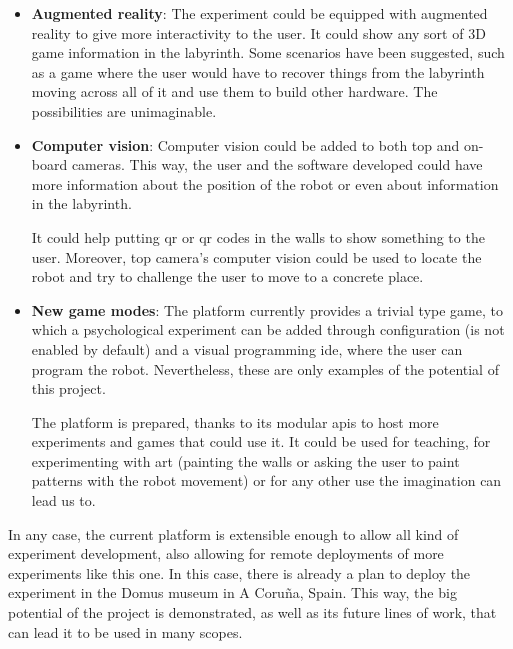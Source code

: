 \begin{itemize}

	\item \textbf{Augmented reality}: The experiment could be equipped with augmented reality to give
	more interactivity to the user. It could show any sort of 3D game information in the labyrinth. Some
	scenarios have been suggested, such as a game where the user would have to recover things from the
	labyrinth moving across all of it and use them to build other hardware. The possibilities are
	unimaginable.

	\item \textbf{Computer vision}: Computer vision could be added to both top and on-board cameras.
	This way, the user and the software developed could have more information about the position of the
	robot or even about information in the labyrinth.

	It could help putting \acrshort{qr} or
	\acrlong{qr} codes in the walls to show something to the user. Moreover, top camera's computer
	vision could be used to locate the robot and try to challenge the user to move to a concrete place.

	\item \textbf{New game modes}: The platform currently provides a trivial type game, to which a
	psychological experiment can be added through configuration (is not enabled by default) and a visual
	programming \acrshort{ide}, where the user can program the robot. Nevertheless, these are only
	examples of the potential of this project.

	The platform is prepared, thanks to its modular \acrshort{api}s to host more experiments and games
	that could use it. It could be used for teaching, for experimenting with art (painting the walls or
	asking the user to paint patterns with the robot movement) or for any other use the imagination can
	lead us to.

\end{itemize}

In any case, the current platform is extensible enough to allow all kind of experiment development,
also allowing for remote deployments of more experiments like this one. In this case, there is
already a plan to deploy the experiment in the Domus museum in A Coruña, Spain. This way, the big
potential of the project is demonstrated, as well as its future lines of work, that can lead it to
be used in many scopes.
